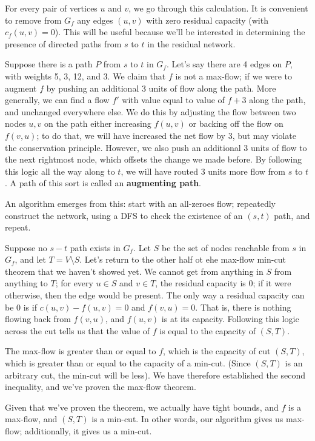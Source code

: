 \documentclass{article}
\begin{document}
For every pair of vertices $u$ and $v$, we go through this calculation.
It is convenient to remove from $G_f$ any edges $(u,v)$ with zero
residual capacity (with $c_f(u,v) = 0$).
This will be useful because we'll be interested in determining the presence
of directed paths from $s$ to $t$ in the residual network.

Suppose there is a path $P$ from $s$ to $t$ in $G_f$.
Let's say there are 4 edges on $P$, with weights 5, 3, 12, and 3.
We claim that $f$ is not a max-flow; if we were to augment $f$ by pushing
an additional 3 units of flow along the path.
More generally, we can find a flow $f'$ with value equal to value of $f + 3$
along the path, and unchanged everywhere else.
We do this by adjusting the flow between two nodes $u,v$ on the path either
increasing $f(u,v)$ or backing off the flow on $f(v,u)$; to do that, we
will have increased the net flow by $3$, but may violate the conservation
principle. However, we also push an additional 3 units of flow to the
next rightmost node, which offsets the change we made before.
By following this logic all the way along to $t$, we will have routed
3 units more flow from $s$ to $t$.
A path of this sort is called an \textbf{augmenting path}.

An algorithm emerges from this: start with an all-zeroes flow; repeatedly
construct the network, using a DFS to check the existence of an $(s,t)$ path, 
and repeat.

Suppose no $s-t$ path exists in $G_f$.
Let $S$ be the set of nodes reachable from $s$ in $G_f$, and let 
$T = V\setminus S$.
Let's return to the other half ot ehe max-flow min-cut theorem that we haven't
showed yet.
We cannot get from anything in $S$ from anything to $T$; for every $u\in S$
and $v\in T$, the residual capacity is $0$; if it were otherwise, then the
edge would be present.
The only way a residual capacity can be $0$ is if $c(u,v) - f(u,v) = 0$ and $f(v,u) = 0$.
That is, there is nothing flowing back from $f(v,u)$, and $f(u,v)$ is at its
capacity.
Following this logic across the cut tells us that the value of $f$ is equal
to the capacity of $(S,T)$.

The max-flow is greater than or equal to $f$, which is the capacity of cut
$(S,T)$, which is greater than or equal to the capacity of a min-cut.
(Since $(S,T)$ is an arbitrary cut, the min-cut will be less).
We have therefore established the second inequality, and we've proven
the max-flow theorem.

Given that we've proven the theorem, we actually have tight bounds, and
$f$ is a max-flow, and $(S,T)$ is a min-cut.
In other words, our algorithm gives us max-flow; additionally, it gives us
a min-cut.
\end{document}

